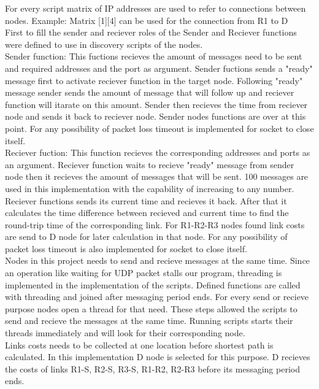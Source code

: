\documentclass[conference]{IEEEtran}
\begin{document}
For every script matrix of IP addresses are used to refer to connections between nodes. Example: Matrix [1][4] can be used for the connection from R1 to D\\

First to fill the sender and reciever roles of the Sender and Reciever functions were defined to use in discovery scripts of the nodes. \\


Sender function: This fuctions recieves the amount of messages need to be sent and required addresses and the port as argument. Sender fuctions sends a "ready" message first to activate reciever function in the target node. Following "ready" message sender sends the amount of message that will follow up and reciever function will itarate on this amount. Sender then recieves the time from reciever node and sends it back to reciever node. Sender nodes functions are over at this point. For any possibility of packet loss timeout is implemented for socket to close itself. \\

Reciever fuction: This function recieves the corresponding addresses and ports as an argument. Reciever function waits to recieve "ready" message from sender node then it recieves the amount of messages that will be sent. 100 messages are used in this implementation with the capability of increasing to any number. Reciever functions sends its current time and recieves it back. After that it calculates the time difference between recieved and current time to find the round-trip time of the corresponding link. For R1-R2-R3 nodes found link costs are send to D node for later calculation in that node. For any possibility of packet loss timeout is also implemented for socket to close itself.\\

Nodes in this project needs to send and recieve messages at the same time. Since an operation like waiting for UDP packet stalls our program, threading is implemented in the implementation of the scripts. Defined functions are called with threading and joined after messaging period ends. For every send or recieve purpose nodes open a thread for that need. These steps allowed the scripts to send and recieve the messages at the same time. Running scripts starts their threads immediately and will look for their corresponding node.\\

Links costs needs to be collected at one location before shortest path is calculated. In this implementation D node is selected for this purpose. D recieves the costs of links R1-S, R2-S, R3-S, R1-R2, R2-R3 before its messaging period ends.\\
\end{document}
